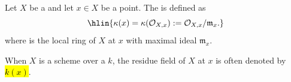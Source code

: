 \begin{definition} \label{definition:residue_field_of_a_scheme_at_a_point}
    Let $X$ be a  and let $x \in X$ be a point. The  is defined as
    $$\hlin{\kappa(x) = \kappa(\mathcal{O}_{X,x}) := \mathcal{O}_{X,x} / \mathfrak{m}_x.}$$
    where  is the local ring of $X$ at $x$ with maximal ideal $\mathfrak{m}_x$. 

    When $X$ is a scheme over a  $k$, the residue field of $X$ at $x$ is often denoted by \hl{$k(x)$}.
\end{definition}